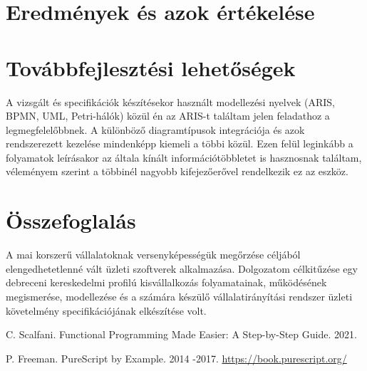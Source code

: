 \documentclass[12pt]{article}
\begin{document}
\newpage
\section{Eredmények és azok értékelése}

\newpage
\section{Továbbfejlesztési lehetőségek}

A vizsgált és specifikációk készítésekor használt modellezési nyelvek (ARIS, BPMN, UML, Petri-hálók) közül én az ARIS-t találtam jelen feladathoz a legmegfelelőbbnek. A különböző diagramtípusok integrációja és azok rendszerezett kezelése mindenképp kiemeli a többi közül. Ezen felül leginkább a folyamatok leírásakor az általa kínált információtöbbletet is hasznosnak találtam, véleményem szerint a többinél nagyobb kifejezőerővel rendelkezik ez az eszköz. 

\newpage
\section*{Összefoglalás}

A mai korszerű vállalatoknak versenyképességük megőrzése céljából elengedhetetlenné vált üzleti szoftverek alkalmazása. Dolgozatom célkitűzése egy debreceni kereskedelmi profilú kisvállalkozás folyamatainak, működésének megismerése, modellezése és a számára készülő vállalatirányítási rendszer üzleti követelmény specifikációjának elkészítése volt. 



%

\newpage
\renewcommand{\refname}{Irodalomjegyzék}
\begin{thebibliography}{99}

C. Scalfani. Functional Programming Made Easier: A Step-by-Step Guide. 2021.

P. Freeman. PureScript by Example. 2014 -2017.
\url{https://book.purescript.org/}

\end{thebibliography}
\end{document}
